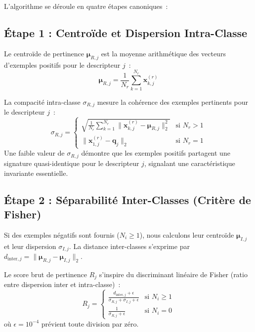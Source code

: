 L'algorithme se déroule en quatre étapes canoniques~:

\subsection{Étape 1 : Centroïde et Dispersion Intra-Classe}
Le centroïde de pertinence $\boldsymbol{\mu}_{R, j}$ est la moyenne arithmétique des vecteurs d'exemples positifs pour le descripteur $j$~:
\begin{equation}
\boldsymbol{\mu}_{R, j} = \frac{1}{N_r} \sum_{k=1}^{N_r} \mathbf{x}_{k, j}^{(r)}
\end{equation}

La compacité intra-classe $\sigma_{R, j}$ mesure la cohérence des exemples pertinents pour le descripteur $j$~:
\begin{equation}
\sigma_{R, j} = \begin{cases}
\sqrt{ \frac{1}{N_r} \sum_{k=1}^{N_r} \|\mathbf{x}_{k, j}^{(r)} - \boldsymbol{\mu}_{R, j}\|_2^2 } & \text{si } N_r > 1 \\
\|\mathbf{x}_{1, j}^{(r)} - \mathbf{q}_j\|_2 & \text{si } N_r = 1
\end{cases}
\end{equation}
Une faible valeur de $\sigma_{R, j}$ démontre que les exemples positifs partagent une signature quasi-identique pour le descripteur $j$, signalant une caractéristique invariante essentielle.

\subsection{Étape 2 : Séparabilité Inter-Classes (Critère de Fisher)}
Si des exemples négatifs sont fournis ($N_i \ge 1$), nous calculons leur centroïde $\boldsymbol{\mu}_{I, j}$ et leur dispersion $\sigma_{I, j}$. La distance inter-classes s'exprime par $d_{\text{inter}, j} = \|\boldsymbol{\mu}_{R, j} - \boldsymbol{\mu}_{I, j}\|_2$.

Le score brut de pertinence $R_j$ s'inspire du discriminant linéaire de Fisher (ratio entre dispersion inter et intra-classe)~:
\begin{equation}
R_j = \begin{cases}
\frac{d_{\text{inter}, j} + \epsilon}{\sigma_{R, j} + \sigma_{I, j} + \epsilon} & \text{si } N_i \ge 1 \\
\frac{1}{\sigma_{R, j} + \epsilon} & \text{si } N_i = 0
\end{cases}
\end{equation}
où $\epsilon = 10^{-4}$ prévient toute division par zéro.

